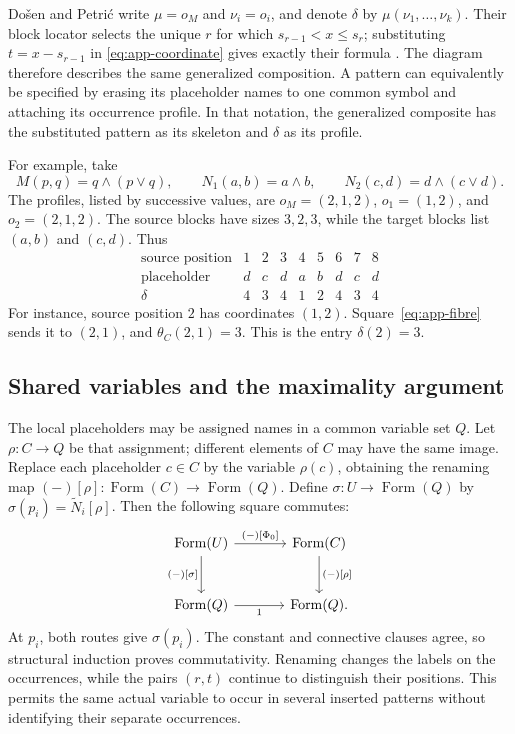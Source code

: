 \documentclass[11pt]{article}
\newcommand{\FormulaSet}{\operatorname{Form}}
\begin{document}
Do\v{s}en and Petri\'c write $\mu=o_M$ and $\nu_i=o_i$, and denote
$\delta$ by $\mu(\nu_1,\ldots,\nu_k)$. Their block locator selects the
unique $r$ for which $s_{r-1}<x\leq s_r$; substituting
$t=x-s_{r-1}$ in \eqref{eq:app-coordinate} gives exactly their
formula \cite[\S2.5, p.~46]{DP}. The diagram therefore describes the
same generalized composition. A pattern can equivalently be
specified by erasing its placeholder names to one common symbol and
attaching its occurrence profile. In that notation, the generalized
composite has the substituted pattern as its skeleton and $\delta$
as its profile.

For example, take
\[
 M(p,q)=q\wedge(p\vee q),\qquad
 N_1(a,b)=a\wedge b,\qquad
 N_2(c,d)=d\wedge(c\vee d).
\]
The profiles, listed by successive values, are
$o_M=(2,1,2)$, $o_1=(1,2)$, and $o_2=(2,1,2)$.
The source blocks have sizes $3,2,3$, while the target blocks list
$(a,b)$ and $(c,d)$. Thus
\[
\begin{array}{c|ccc|cc|ccc}
 \text{source position}&1&2&3&4&5&6&7&8\\\hline
 \text{placeholder}&d&c&d&a&b&d&c&d\\
 \delta&4&3&4&1&2&4&3&4
\end{array}
\]
For instance, source position $2$ has coordinates $(1,2)$.
Square~\eqref{eq:app-fibre} sends it to $(2,1)$, and
$\theta_C(2,1)=3$. This is the entry $\delta(2)=3$.

\subsection{Shared variables and the maximality argument}\label{app:shared}

The local placeholders may be assigned names in a common variable
set $Q$. Let $\rho:C\to Q$ be that assignment; different elements
of $C$ may have the same image. Replace each placeholder $c\in C$
by the variable $\rho(c)$, obtaining the renaming map
$(-)[\rho]:\FormulaSet(C)\to\FormulaSet(Q)$. Define
$\sigma:U\to\FormulaSet(Q)$ by
$\sigma(p_i)=\widetilde N_i[\rho]$.
Then the following square commutes:
\begin{equation}\label{eq:app-renaming}
\begin{tikzcd}[column sep=large,row sep=large]
 \FormulaSet(U)\arrow[r,"{(-)[\Phi_0]}"]
    \arrow[d,"{(-)[\sigma]}"']
   &\FormulaSet(C)\arrow[d,"{(-)[\rho]}"]\\
 \FormulaSet(Q)\arrow[r,"1"']&\FormulaSet(Q).
\end{tikzcd}
\end{equation}
At $p_i$, both routes give $\sigma(p_i)$. The constant and connective
clauses agree, so structural induction proves commutativity.
Renaming changes the labels on the occurrences, while the pairs
$(r,t)$ continue to distinguish their positions. This permits the
same actual variable to occur in several inserted patterns without
identifying their separate occurrences.
\end{document}
